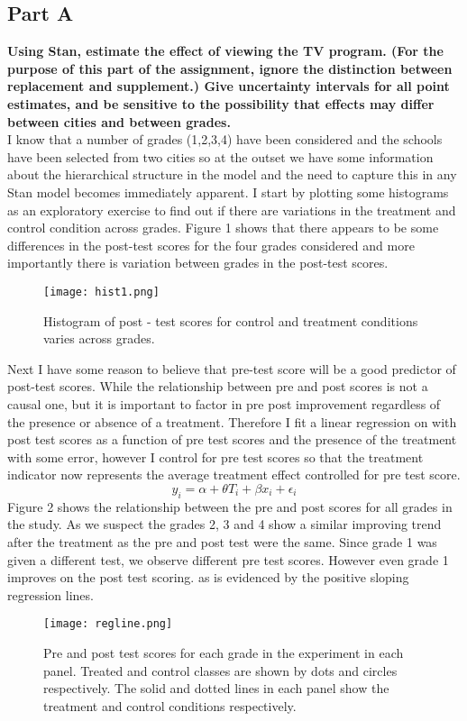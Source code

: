 \documentclass{article}
\begin{document}
\subsection{Part A}
\textbf{Using Stan, estimate the effect of viewing the TV program. (For the purpose of this part of the assignment, ignore the distinction between replacement and supplement.) Give uncertainty intervals for all point estimates, and be sensitive to the possibility that effects may differ between cities and between grades.}\\
I know that a number of grades (1,2,3,4) have been considered and the schools have been selected from two cities so at the outset we have some information about the hierarchical structure in the model and the need to capture this in any Stan model becomes immediately apparent. I start by plotting some histograms as an exploratory exercise to find out if there are variations in the treatment and control condition across grades. Figure 1 shows that there appears to be some differences in the post-test scores for the four grades considered and more importantly there is variation between grades in the post-test scores.
 \begin{figure}[H]
\centering
\texttt{[image: hist1.png]}
\caption{Histogram of post - test scores for control and treatment conditions varies across grades.}
\label{deltat}
\end{figure}
Next I have some reason to believe that pre-test score will be a good predictor of post-test scores. While the relationship between pre and post scores is not a causal one, but it is important to factor in pre post improvement regardless of the presence or absence of a treatment. Therefore I fit a linear regression on with post test scores as a function of pre test scores and the presence of the treatment with some error, however I control for pre test scores so that the treatment indicator now represents the average treatment effect controlled for pre test score.
$$y_i = \alpha + \theta T_i + \beta x_i + \epsilon_i$$
Figure 2 shows the relationship between the pre and post scores for all grades in the study. As we suspect the grades 2, 3 and 4 show a similar improving trend after the treatment as the pre and post test were the same. Since grade 1 was given a different test, we observe different pre test scores. However even grade 1 improves on the post test scoring. as is evidenced by the positive sloping regression lines.
\begin{figure}[H]
\centering
\texttt{[image: regline.png]}
\caption{Pre and post test scores for each grade in the experiment in each panel. Treated and control classes are shown by dots and circles respectively. The solid and dotted lines in each panel show the treatment and control conditions respectively.  }
\label{deltat}
\end{figure}
\end{document}
